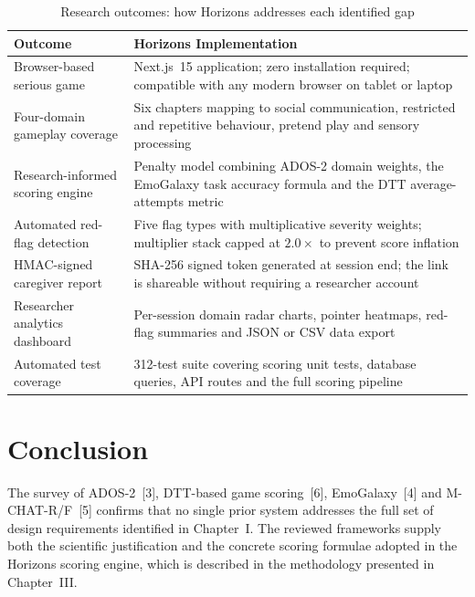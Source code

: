 \documentclass[12pt,a4paper,oneside]{report}
\begin{document}
\begin{table}[b]
  \caption{Research outcomes: how Horizons addresses each identified gap}
  \label{tab:outcomes}
  \begin{tabularx}{\linewidth}{p{4.6cm}X}
    \toprule
    \textbf{Outcome} & \textbf{Horizons Implementation} \\
    \midrule
    Browser-based serious game
      & Next.js~15 application; zero installation required; compatible with any modern browser on tablet or laptop \\
    Four-domain gameplay coverage
      & Six chapters mapping to social communication, restricted and repetitive behaviour, pretend play and sensory processing \\
    Research-informed scoring engine
      & Penalty model combining ADOS-2 domain weights, the EmoGalaxy task accuracy formula and the DTT average-attempts metric \\
    Automated red-flag detection
      & Five flag types with multiplicative severity weights; multiplier stack capped at $2.0\times$ to prevent score inflation \\
    HMAC-signed caregiver report
      & SHA-256 signed token generated at session end; the link is shareable without requiring a researcher account \\
    Researcher analytics dashboard
      & Per-session domain radar charts, pointer heatmaps, red-flag summaries and JSON or CSV data export \\
    Automated test coverage
      & 312-test suite covering scoring unit tests, database queries, API routes and the full scoring pipeline \\
    \bottomrule
  \end{tabularx}
\end{table}

\section{Conclusion}

The survey of ADOS-2~[3], DTT-based game scoring~[6], EmoGalaxy~[4] and M-CHAT-R/F~[5] confirms that no single prior system addresses the full set of design requirements identified in Chapter~I. The reviewed frameworks supply both the scientific justification and the concrete scoring formulae adopted in the Horizons scoring engine, which is described in the methodology presented in Chapter~III.

\clearpage
\end{document}
